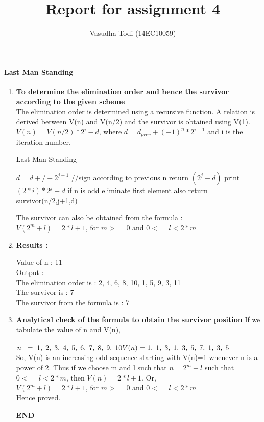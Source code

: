 \documentclass[a4paper,11pt]{article}
\title{Report for assignment 4}
\author{Vasudha Todi (14EC10059)}
\begin{document}
\maketitle


\paragraph{Last Man Standing}
\begin{enumerate}
 \item \textbf{To determine the elimination order and hence the survivor according to the given scheme}\\
The elimination order is determined using a recursive function. A relation is derived between V(n) and V(n/2) and the survivor is obtained using V(1).\\
$V(n) = V(n/2)*2^i - d$, where $d = d_{prev} + (-1)^n*2^{i-1}$ and i is the iteration number.

  \begin{algorithm}
    \caption{Last Man Standing}
    \begin{algorithmic}[1]
    \State $d =  d +/-  2^{j-1}$               //sign according to previous n
        \State return $(2^j - d)$
    \EndIf
        \State print $(2*i)*2^j - d$
    \EndFor
    \State if n is odd eliminate first element also
    \State return survivor(n/2,j+1,d)
    \end{algorithmic}
  \end{algorithm}
  
  The survivor can also be obtained from the formula :\\
  $V(2^m +l) = 2*l + 1$, for $m>=0$ and $0<=l<2*m$
 
 \item \textbf{Results :}
 
 Value of n : 11\\
 Output :\\
 The elimination order is : 2, 4, 6, 8, 10, 1, 5, 9, 3, 11\\
 The survivor is : 7\\
 The survivor from the formula is : 7

 \item \textbf{Analytical check of the formula to obtain the survivor position}
 If we tabulate the value of n and V(n),\\\\
 $n\;\;   =    \; 1, \; 2, \; 3, \; 4, \; 5, \; 6, \; 7, \; 8, \; 9, \; 10\\
  V(n) =  1, \; 1, \; 3, \; 1, \; 3, \; 5, \; 7, \; 1, \; 3, \; 5$\\
 So, V(n) is an increasing odd sequence starting with V(n)=1 whenever n is a power of 2. Thus if we choose m and l such that $n = 2^m + l$ such that $0<=l<2*m$, then $V(n) = 2*l+1$. Or,\\
 $V(2^m +l) = 2*l + 1$, for $m>=0$ and $0<=l<2*m$\\
 Hence proved.
 
 \textbf{END}
\end{enumerate}
\end{document}
